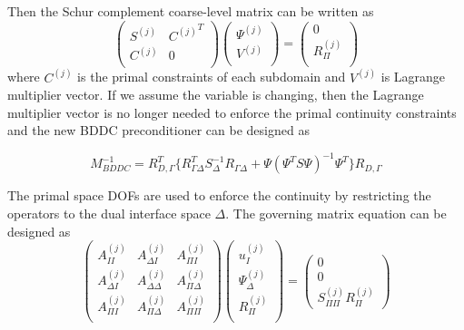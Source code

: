 Then the Schur complement coarse-level matrix can be written as 
\begin{equation}
\begin{pmatrix}
S^{(j)} & {C^{(j)}}^{T} \\
C^{(j)} & 0 \\
\end{pmatrix} \begin{pmatrix}
\Psi^{(j)} \\ V^{(j)} \\
\end{pmatrix} = \begin{pmatrix}
0 \\ R_{\Pi}^{(j)}\\
\end{pmatrix}
\end{equation}
 where $ C^{(j)} $ is the primal constraints of each subdomain and $ V^{(j)} $ is Lagrange multiplier vector. If we assume the variable is changing, then the Lagrange multiplier vector is no longer needed to enforce the primal continuity constraints and the new BDDC preconditioner can be designed as
 
 \begin{equation}
 M_{BDDC}^{-1} = R_{D, \Gamma}^{T} \{ R_{\Gamma \Delta}^{T} S^{-1}_{\Delta} R_{\Gamma \Delta} + \Psi (\Psi^{T} S \Psi)^{-1} \Psi^{T} \} R_{D, \Gamma}
 \end{equation}
 
 The primal space DOFs are used to enforce the continuity by restricting the operators to the dual interface space $ \Delta $. The governing matrix equation can be designed as
 \begin{equation}
 \begin{pmatrix}
 A_{II}^{(j)} & A_{\Delta I}^{(j)} & A^{(j)}_{\Pi I} \\
 A_{\Delta I}^{(j)} & A_{\Delta \Delta}^{(j)} & A_{\Pi \Delta}^{(j)} \\
 A_{\Pi I}^{(j)} & A_{\Pi \Delta}^{(j)} & A_{\Pi \Pi}^{(j)} \\
 \end{pmatrix} \begin{pmatrix}
 u_{I}^{(j)} \\ \Psi_{\Delta}^{(j)} \\ R_{\Pi}^{(j)} \\
 \end{pmatrix} = \begin{pmatrix}
 0 \\ 0 \\ S_{\Pi \Pi}^{(j)} R_{\Pi}^{(j)}
 \end{pmatrix}
 \end{equation}
 
